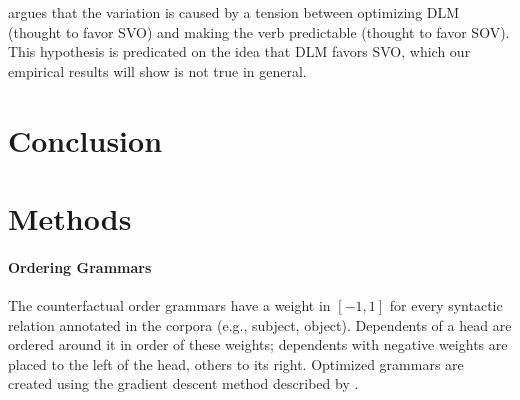 \documentclass[11pt,a4paper]{article}
\begin{document}
\cite{ferrer-i-cancho-placement-2017} argues that the variation is caused by a tension between optimizing DLM (thought to favor SVO) and making the verb predictable (thought to favor SOV). This hypothesis is predicated on the idea that DLM favors SVO, which our empirical results will show is not true in general.


\section{Conclusion}

\section*{Methods}





\paragraph{Ordering Grammars}

The counterfactual order grammars have a weight in $[-1, 1]$ for every syntactic relation annotated in the corpora (e.g., subject, object).
Dependents of a head are ordered around it in order of these weights; dependents with negative weights are placed to the left of the head, others to its right.
Optimized grammars are created using the gradient descent method described by \citep{hahn2020universals}.



\end{document}
